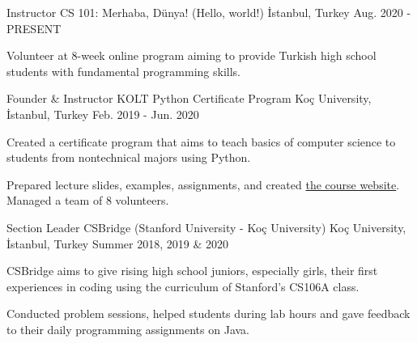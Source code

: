 
\vspace*{-1.5mm}

\begin{cventries}


  \cventry
    {Instructor}
    {CS 101: Merhaba, Dünya! (Hello, world!)}
    {İstanbul, Turkey}
    {Aug. 2020 - PRESENT}
    {
      \begin{cvitems}
        \item {Volunteer at 8-week online program aiming to provide Turkish high school students with fundamental programming skills.}
      \end{cvitems}
    }


  \cventry
    {Founder \& Instructor}
    {KOLT Python Certificate Program}
    {Koç University, İstanbul, Turkey}
    {Feb. 2019 - Jun. 2020}
    {
      \begin{cvitems}
        \item {Created a certificate program that aims to teach basics of computer science to students from nontechnical majors using Python.}
        \item {Prepared lecture slides, examples, assignments, and created \href{https://koltpython.github.io}{the course website}. Managed a team of 8 volunteers.}
      \end{cvitems}
    }

    \cventry
    {Section Leader}%
    {CSBridge (Stanford University - Koç University)} %
    {Koç University, İstanbul, Turkey}
    {Summer 2018, 2019 \& 2020} 
    {
      \begin{cvitems}
        \item{CSBridge aims to give rising high school juniors, especially girls, their first experiences in coding using the curriculum of Stanford's CS106A class.} 	             
        \item{Conducted problem sessions, helped students during lab hours and gave feedback to their daily programming assignments on Java.}
      \end{cvitems}
    }


\end{cventries}
